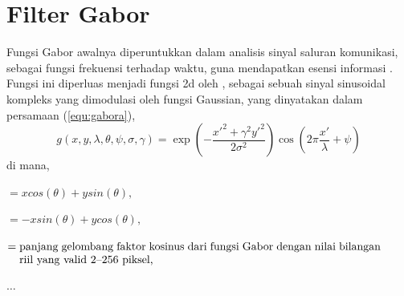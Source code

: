 \section{Filter Gabor}
Fungsi Gabor awalnya diperuntukkan dalam analisis sinyal saluran komunikasi, sebagai fungsi frekuensi terhadap waktu, guna mendapatkan esensi informasi . Fungsi ini diperluas menjadi fungsi \acrshort{2d} oleh , sebagai sebuah sinyal sinusoidal kompleks yang dimodulasi oleh fungsi Gaussian, yang dinyatakan  dalam persamaan (\ref{equ:gabora}),
\begin{equation}
    g(x,y,\lambda,\theta,\psi,\sigma,\gamma) = \exp\left(-\frac{x'^2+\gamma^2y'^2}{2\sigma^2}\right) \cos\left(2\pi\frac{x'}{\lambda}+\psi\right)
    \label{equ:gabora}
\end{equation}
di mana,
\begin{description}[align=parleft,labelwidth=1cm]
    \item[$x'$] $= xcos(\theta) + ysin(\theta),$
    \item[$y'$] $= -xsin(\theta) + ycos(\theta),$
    \item[$\lambda$] $= \parbox[t]{11.35cm}{panjang gelombang faktor kosinus dari fungsi Gabor dengan nilai bilangan riil yang valid 2--256 piksel,}$
    \item[\dots] $\dots$
\end{description}

